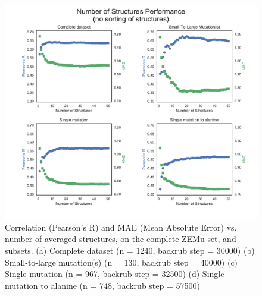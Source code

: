 \begin{figure}
  \includegraphics[width=\textwidth,keepaspectratio]{structs-v-corr-id.pdf}
  \caption{
    Correlation (Pearson's R) and MAE (Mean Absolute Error) vs. number of averaged structures, on the complete ZEMu set, and subsets.
    (a) Complete dataset (n = 1240, backrub step = 30000)
    (b) Small-to-large mutation(s) (n = 130, backrub step = 40000)
    (c) Single mutation (n = 967, backrub step = 32500)
    (d) Single mutation to alanine (n = 748, backrub step = 57500)
  } \label{fig:structs-v-corr-id}
\end{figure}
